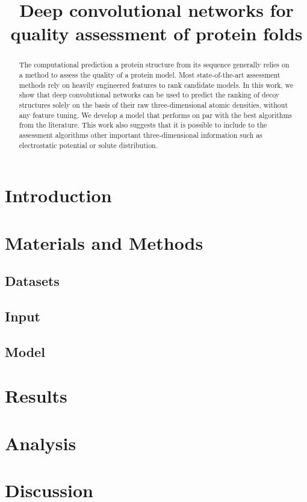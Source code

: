 \documentclass[letter,10pt]{article}
\title{Deep convolutional networks for quality assessment of protein folds}
\author{}
\begin{document}
\maketitle

\begin{abstract}
The computational prediction a protein structure from its sequence
generally relies on a method to assess the quality of a protein
model. Most state-of-the-art assessment methods rely on heavily
engineered features to rank candidate models. In this work, we show
that deep convolutional networks can be used to predict the ranking of
decoy structures solely on the basis of their raw three-dimensional
atomic densities, without any feature tuning.  We develop a model that
performs on par with the best algorithms from the literature. This
work also suggests that it is possible to include to the assessment
algorithms other important three-dimensional information such as
electrostatic potential or solute distribution.
\end{abstract}

\section{Introduction}


\section{Materials and Methods}

\subsection{Datasets}


\subsection{Input}


\subsection{Model}




\section{Results}


\section{Analysis}


\section{Discussion}




\end{document}
